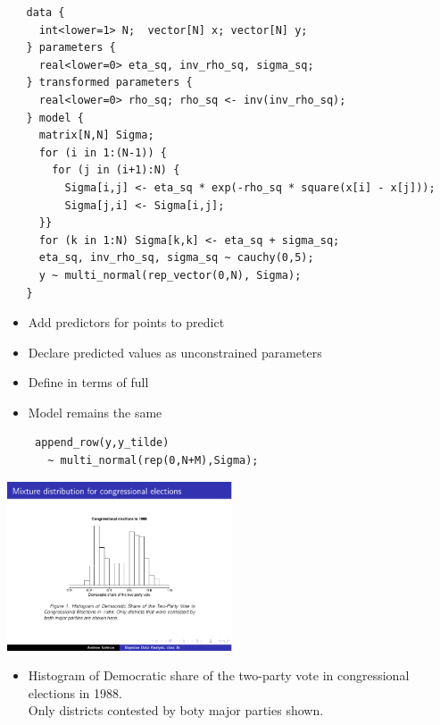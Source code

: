 \documentclass[10pt]{report}
\begin{document}
\vspace*{-2pt}
{\footnotesize
\begin{Verbatim}
   data {
     int<lower=1> N;  vector[N] x; vector[N] y;
   } parameters {
     real<lower=0> eta_sq, inv_rho_sq, sigma_sq;
   } transformed parameters {
     real<lower=0> rho_sq; rho_sq <- inv(inv_rho_sq);
   } model {
     matrix[N,N] Sigma;
     for (i in 1:(N-1)) { 
       for (j in (i+1):N) {
         Sigma[i,j] <- eta_sq * exp(-rho_sq * square(x[i] - x[j]));
         Sigma[j,i] <- Sigma[i,j];
     }}
     for (k in 1:N) Sigma[k,k] <- eta_sq + sigma_sq;
     eta_sq, inv_rho_sq, sigma_sq ~ cauchy(0,5);
     y ~ multi_normal(rep_vector(0,N), Sigma);
   }
\end{Verbatim}
}

\begin{itemize}
\item Add predictors  for points to predict
\item Declare predicted values  as unconstrained parameters
\item Define  in terms of full 
\item Model remains the same
{\small
\begin{Verbatim}
 append_row(y,y_tilde)
   ~ multi_normal(rep(0,N+M),Sigma);
\end{Verbatim}
}
\end{itemize}

\begin{center}
\includegraphics[width=0.5\textwidth]{img/bimodal-vote-88.pdf}
\end{center}
\begin{itemize}
\item
Histogram of Democratic share of the two-party vote in congressional
elections in 1988.
\\[8pt]
{\footnotesize Only districts contested by boty major parties shown.}
\end{itemize}
\end{document}
